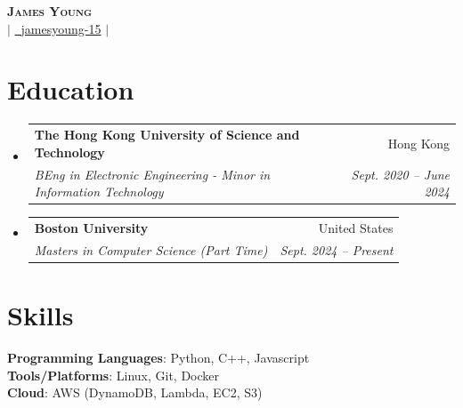 \documentclass[letterpaper,12pt]{article}
\makeatletter
\newcommand{\resumeSubheading}[4]{
  \vspace{-2pt}\item
    \begin{tabular*}{0.97\textwidth}[t]{l@{\extracolsep{\fill}}r}
      \textbf{#1} & #2 \\
      \textit{\small#3} & \textit{\small #4} \\
    \end{tabular*}\vspace{-7pt}
}
\newcommand{\resumeSubHeadingListStart}{\begin{itemize}[leftmargin=0.05in, label={}]}
\newcommand{\resumeSubHeadingListEnd}{\end{itemize}}
\makeatother
\begin{document}
\begin{center}
    \textbf{\Huge \scshape James Young} \\ \vspace{2pt}
    \small 
    \href{mailto:jyyoung@bu.edu}{} $|$ 
    \href{https://github.com/jamesyoung-15} {\faGithub\ {jamesyoung-15}} $|$
    \href{https://linkedin.com/in/jamesyyoung}{}
\end{center}


\section{Education}
  \resumeSubHeadingListStart
    \resumeSubheading
      {The Hong Kong University of Science and Technology}{Hong Kong}
      {BEng in Electronic Engineering - Minor in Information Technology}{Sept. 2020 -- June 2024}
  \resumeSubHeadingListEnd
  \resumeSubHeadingListStart
    \resumeSubheading
      {Boston University}{United States}
      {Masters in Computer Science (Part Time)}{Sept. 2024 -- Present}
  \resumeSubHeadingListEnd


\section{Skills}
 \begin{itemize}[leftmargin=0.15in, label={}]
    \small{\item{
     \textbf{Programming Languages}{: Python, C++, Javascript} \\
     \textbf{Tools/Platforms}{: Linux, Git, Docker} \\ 
     \textbf{Cloud}{: AWS (DynamoDB, Lambda, EC2, S3)} \\
    }}
 \end{itemize}
\end{document}
